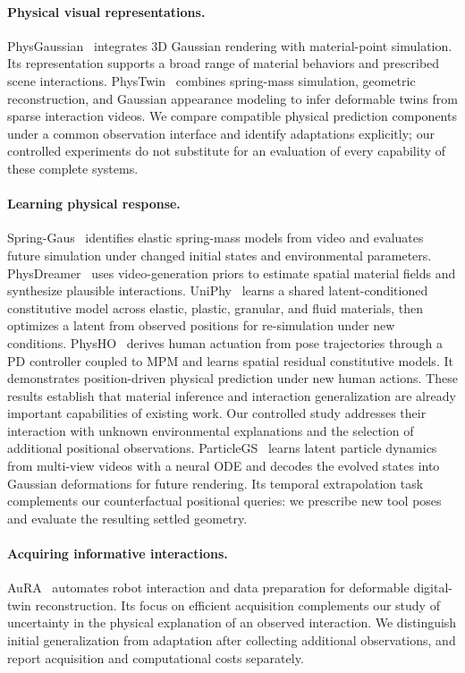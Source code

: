 \documentclass[10pt,twocolumn,letterpaper]{article}
\begin{document}
\paragraph{Physical visual representations.}
PhysGaussian~\cite{xie2024physgaussian} integrates 3D Gaussian rendering with material-point simulation. Its representation supports a broad range of material behaviors and prescribed scene interactions. PhysTwin~\cite{jiang2025phystwin} combines spring-mass simulation, geometric reconstruction, and Gaussian appearance modeling to infer deformable twins from sparse interaction videos. We compare compatible physical prediction components under a common observation interface and identify adaptations explicitly; our controlled experiments do not substitute for an evaluation of every capability of these complete systems.

\paragraph{Learning physical response.}
Spring-Gaus~\cite{zhong2024springgaus} identifies elastic spring-mass models from video and evaluates future simulation under changed initial states and environmental parameters. PhysDreamer~\cite{zhang2024physdreamer} uses video-generation priors to estimate spatial material fields and synthesize plausible interactions. UniPhy~\cite{mittal2025uniphy} learns a shared latent-conditioned constitutive model across elastic, plastic, granular, and fluid materials, then optimizes a latent from observed positions for re-simulation under new conditions. PhysHO~\cite{jiang2026physho} derives human actuation from pose trajectories through a PD controller coupled to MPM and learns spatial residual constitutive models. It demonstrates position-driven physical prediction under new human actions. These results establish that material inference and interaction generalization are already important capabilities of existing work. Our controlled study addresses their interaction with unknown environmental explanations and the selection of additional positional observations. ParticleGS~\cite{quan2026particlegs} learns latent particle dynamics from multi-view videos with a neural ODE and decodes the evolved states into Gaussian deformations for future rendering. Its temporal extrapolation task complements our counterfactual positional queries: we prescribe new tool poses and evaluate the resulting settled geometry.

\paragraph{Acquiring informative interactions.}
AuRA~\cite{yu2026aura} automates robot interaction and data preparation for deformable digital-twin reconstruction. Its focus on efficient acquisition complements our study of uncertainty in the physical explanation of an observed interaction. We distinguish initial generalization from adaptation after collecting additional observations, and report acquisition and computational costs separately.
\end{document}

